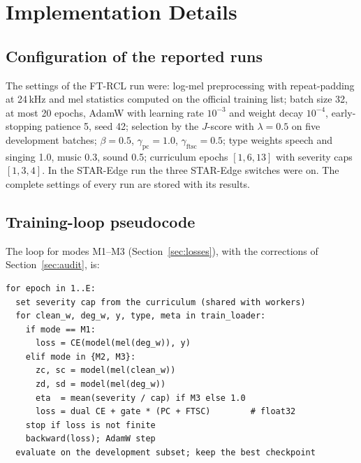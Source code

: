\chapter{Implementation Details}
\label{app:details}

\section{Configuration of the reported runs}
\label{app:config}

The settings of the FT-RCL run were: log-mel preprocessing with repeat-padding at 24\,kHz and mel statistics computed on the official training list; batch size 32, at most 20 epochs, AdamW with learning rate $10^{-3}$ and weight decay $10^{-4}$, early-stopping patience 5, seed 42; selection by the $J$-score with $\lambda=0.5$ on five development batches; $\beta=0.5$, $\gamma_{\mathrm{pc}}=1.0$, $\gamma_{\mathrm{ftsc}}=0.5$; type weights speech and singing 1.0, music 0.3, sound 0.5; curriculum epochs $[1,6,13]$ with severity caps $[1,3,4]$. In the STAR-Edge run the three STAR-Edge switches were on. The complete settings of every run are stored with its results.

\section{Training-loop pseudocode}
\label{app:pseudo}

The loop for modes M1--M3 (Section~\ref{sec:losses}), with the corrections of Section~\ref{sec:audit}, is:

\begingroup
\small
\begin{verbatim}
for epoch in 1..E:
  set severity cap from the curriculum (shared with workers)
  for clean_w, deg_w, y, type, meta in train_loader:
    if mode == M1:
      loss = CE(model(mel(deg_w)), y)
    elif mode in {M2, M3}:
      zc, sc = model(mel(clean_w))
      zd, sd = model(mel(deg_w))
      eta  = mean(severity / cap) if M3 else 1.0
      loss = dual CE + gate * (PC + FTSC)        # float32
    stop if loss is not finite
    backward(loss); AdamW step
  evaluate on the development subset; keep the best checkpoint
\end{verbatim}
\endgroup

